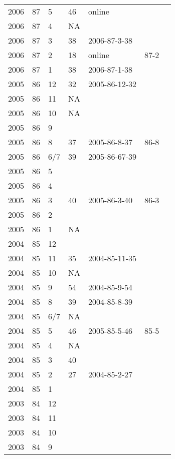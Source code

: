 \begin{longtable}{ |l|l|l|l|p{2.7cm}|l|p{2cm}| }
 2006 & 87 &     5 &      46 & online &  & \\
 2006 & 87 &     4 &      NA &  &  & \\
 2006 & 87 &     3 &      38 & 2006-87-3-38 &  & \\
 2006 & 87 &     2 &      18 & online & 87-2  & \\
 2006 & 87 &     1 &      38 & 2006-87-1-38 &  & \\
 2005 & 86 &    12 &      32 & 2005-86-12-32 &  & \\
 2005 & 86 &    11 &      NA &  &  & \\
 2005 & 86 &    10 &      NA &  &  & \\
 2005 & 86 &     9 &         &  &  & \\
 2005 & 86 &     8 &      37 & 2005-86-8-37 & 86-8  & \\
 2005 & 86 &   6/7 &      39 & 2005-86-67-39 &  & \\
 2005 & 86 &     5 &         &  &  & \\
 2005 & 86 &     4 &         & &  & \\
 2005 & 86 &     3 &      40 &  2005-86-3-40 & 86-3 & \\
 2005 & 86 &     2 &       &   &  & \\
 2005 & 86 &     1 &      NA &  &  & \\
 2004 & 85 &    12 &         &  &  & \\
 2004 & 85 &    11 &      35 & 2004-85-11-35 &  & \\
 2004 & 85 &    10 &      NA &  &  & \\
 2004 & 85 &     9 &      54 & 2004-85-9-54 &  & \\
 2004 & 85 &     8 &      39 & 2004-85-8-39 &  & \\
 2004 & 85 &   6/7 &      NA &  &  & \\
 2004 & 85 &     5 &      46 & 2005-85-5-46 & 85-5 & \\
 2004 & 85 &     4 &      NA &  &  & \\
 2004 & 85 &     3 &      40 &  &  & \\
 2004 & 85 &     2 &      27 & 2004-85-2-27 &  & \\
 2004 & 85 &     1 &         &  &  & \\
 2003 & 84 &    12 &         &  &  & \\
 2003 & 84 &    11 &         &  &  & \\
 2003 & 84 &    10 &         &  &  & \\
 2003 & 84 &     9 &         &  &  & \\

\end{longtable}
